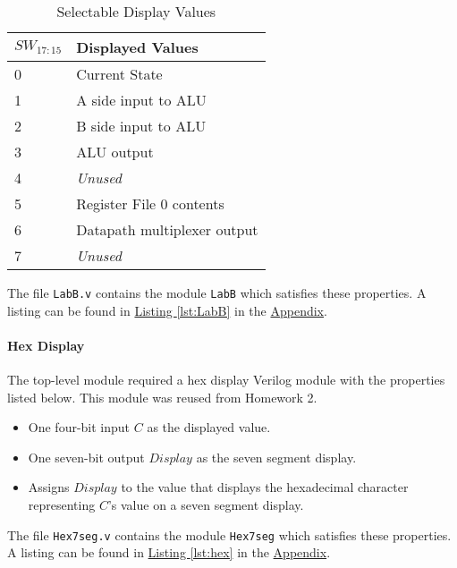 \begin{table}[htbp] 
    \centering
    \begin{tabular}{ll}                             \toprule
        $SW_{17:15}$    & Displayed Values              \\\midrule
        0               & Current State                 \\
        1               & A side input to ALU           \\
        2               & B side input to ALU           \\
        3               & ALU output                    \\
        4               & \emph{Unused}                 \\
        5               & Register File 0 contents      \\
        6               & Datapath multiplexer output   \\
        7               & \emph{Unused}                 \\\bottomrule
    \end{tabular}
\caption{Selectable Display Values\label{tab:display}}
\end{table}

The file \verb|LabB.v| contains the module \verb|LabB| which satisfies these properties.
A listing can be found in \hyperref[lst:LabB]{Listing \ref*{lst:LabB}} in the \hyperref[sec:appendix]{Appendix}.

\paragraph{Hex Display} \label{par:hex}

The top-level module required a hex display Verilog module with the properties listed below.
This module was reused from Homework 2.

\begin{itemize}
    \item One four-bit input $C$ as the displayed value.
    \item One seven-bit output $Display$ as the seven segment display.
    \item Assigns $Display$ to the value that displays the hexadecimal character representing $C$'s value on a seven segment display.
\end{itemize}

The file \verb|Hex7seg.v| contains the module \verb|Hex7seg| which satisfies these properties.
A listing can be found in \hyperref[lst:hex]{Listing \ref*{lst:hex}} in the \hyperref[sec:appendix]{Appendix}.

